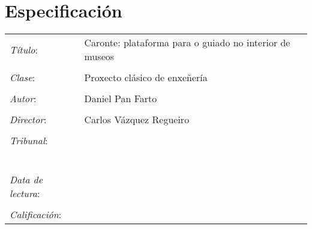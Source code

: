 \chapter*{Especificación}{}


\begin{tabular}{lp{9cm}}
\emph{Título}: & Caronte: plataforma para o guiado no interior de museos \\
& \\
\emph{Clase}: & Proxecto clásico de enxeñería \\
& \\
\emph{Autor}: &  Daniel Pan Farto \\
& \\
\emph{Director}: & Carlos Vázquez Regueiro \\
& \\
\emph{Tribunal}: & \\
& \\
& \\
& \\
& \\
& \\
& \\
\emph{Data de lectura}: & \\
& \\
\emph{Calificación}: & \\
\end{tabular}
